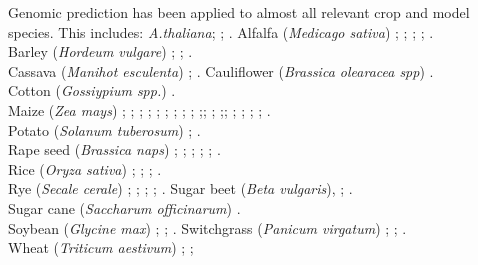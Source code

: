 Genomic prediction has been applied to almost all relevant crop and model species. This
includes: \textit{A.thaliana}; \cite{shen2013novel}; \cite{hu2015}.
Alfalfa (\textit{Medicago sativa}) \cite{li2012applied}; \cite{annicchiarico2015accuracy}; \cite{li2015genomical}; \cite{biazzi2017genome}; \cite{hawkins2018recent}. \\
Barley (\textit{Hordeum vulgare}) \cite{zhong2009factors}; \cite{oakey2016}; \cite{neyhart2019}. \\
Cassava (\textit{Manihot esculenta}) \cite{elias2018}; \cite{elias2018improving}.
Cauliflower (\textit{Brassica olearacea spp}) \cite{thorwarth2018genomic}.\\
Cotton (\textit{Gossiypium spp.}) \cite{gapare2018}.\\
Maize (\textit{Zea mays}) \cite{rincent2012}; \cite{windhausen2012};
\cite{technow2013genomic}; \cite{riedelsheimer2013genomic}; \cite{guo2013accuracy};
\cite{peiffer2014genetic}; \cite{technow2014genome}; \cite{lehermeier2014usefulness};
\cite{owens2014foundation}; \cite{montesinos2015threshold};\cite{bustos2016improvement};
\cite{kadam2016genomic}; \cite{schopp2017accuracy};\cite{schopp2017genomic};
\cite{e2017genomic}; \cite{brauner2018genomic};
\cite{schrag2018beyond}; \cite{moeinizade2019}; \cite{allier2019usefulness}. \\
Potato (\textit{Solanum tuberosum}) \cite{enciso2018genomic}; \cite{Endelman2018pot}.\\
Rape seed (\textit{Brassica naps}) \cite{snowdon2012potential}; \cite{wurschum2014potential}; \cite{qian2014sub}; \cite{jan2016genomic}; \cite{luo2017genomic}; \cite{werner2018effective}.\\
Rice (\textit{Oryza sativa})  \cite{Xu2013rice}; \cite{Grenier2015}; \cite{BenHassen2018}; \cite{Momen2019}. \\
Rye (\textit{Secale cerale}) \cite{bernal2014importance}; \cite{wang2014accuracy};
\cite{auinger2016model}; \cite{marulanda2016optimum}; \cite{bernal2017genomic}.
Sugar beet (\textit{Beta vulgaris}), \cite{wurschum2013genomic}; \cite{biscarini2014genome}.\\
Sugar cane (\textit{Saccharum officinarum}) \cite{gouy2013experimental}.\\
Soybean (\textit{Glycine max}) \cite{Jarquin_2016}; \cite{Xavier_2016};
\cite{Stewart_Brown_2019}.
Switchgrass (\textit{Panicum virgatum}) \cite{Ramstein_2016}; \cite{Poudel_2019}; \cite{Ramstein_2019}. \\
Wheat (\textit{Triticum aestivum}) \cite{Thavamanikumar_2015}; \cite{Lopez_Cruz_2015};
